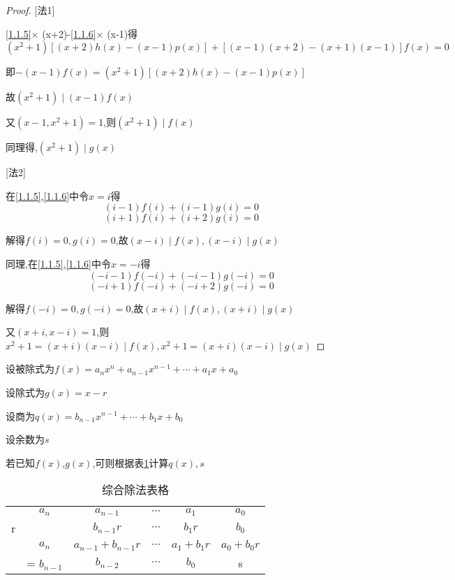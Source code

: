 \begin{proof}

    [法1]

    \cref{1.1.5}$\times$ (x+2)-\cref{1.1.6}$\times$ (x-1)得
    \begin{equation*}
        (x^2+1)[(x+2)h(x)-(x-1)p(x)]+[(x-1)(x+2)-(x+1)(x-1)]f(x)=0
    \end{equation*}

    即$-(x-1)f(x)=(x^2+1)[(x+2)h(x)-(x-1)p(x)]$

    故$(x^2+1)\mid (x-1)f(x)$

    又$(x-1,x^2+1)=1$,则$(x^2+1)\mid f(x)$

    同理得,$(x^2+1)\mid g(x)$

    [法2]

    在\cref{1.1.5},\cref{1.1.6}中令$x=i$得
    \begin{equation*}
        (i-1)f(i)+(i-1)g(i)=0
    \end{equation*}
    \begin{equation*}
        (i+1)f(i)+(i+2)g(i)=0
    \end{equation*}

    解得$f(i)=0,g(i)=0$,故$(x-i)\mid f(x),(x-i)\mid g(x)$

    同理,在\cref{1.1.5},\cref{1.1.6}中令$x=-i$得
    \begin{equation*}
        (-i-1)f(-i)+(-i-1)g(-i)=0
    \end{equation*}
    \begin{equation*}
        (-i+1)f(-i)+(-i+2)g(-i)=0
    \end{equation*}

    解得$f(-i)=0,g(-i)=0$,故$(x+i)\mid f(x),(x+i)\mid g(x)$

    又$(x+i,x-i)=1$,则
    $x^2+1=(x+i)(x-i)\mid f(x),x^2+1=(x+i)(x-i)\mid g(x)$
\end{proof}

\clearpage

\begin{knowledge}[综合除法]
    设被除式为$f(x)=a_nx^n+a_{n-1}x^{n-1}+\cdots +a_1 x+a_0$

    设除式为$g(x)=x-r$

    设商为$q(x)=b_{n-1}x^{n-1}+\cdots +b_1x+b_0$

    设余数为$s$

    若已知$f(x)$,$g(x)$,可则根据表\ref{综合除法}计算$q(x),s$
\end{knowledge}

\begin{table}[htbp]
    \centering
    \renewcommand{\arraystretch}{1.5}
    \begin{tabular}{c|ccccc}
        & $a_n$ & $a_{n-1}$ & $\cdots$ & $a_1$ & $a_0$ \\ 
        r & & $b_{n-1}r$ & $\cdots$ & $b_1r$ & $b_0$\\ 
        \hline 
        & $a_n$ & $a_{n-1}+b_{n-1}r$ & $\cdots$ & $a_1+b_1r$ & $a_0+b_0r$ \\ 
        & = $b_{n-1}$ & $b_{n-2}$ & $\cdots$ & $b_0$ & s
    \end{tabular}
    \caption{综合除法表格}
    \label{综合除法}
\end{table}

